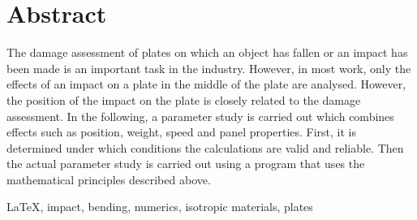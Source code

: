 \chapter*{Abstract} 

The damage assessment of plates on which an object has fallen or an impact has been made is an important task in the industry. However, in most work, only the effects of an impact on a plate in the middle of the plate are analysed. However, the position of the impact on the plate is closely related to the damage assessment. In the following, a parameter study is carried out which combines effects such as position, weight, speed and panel properties. First, it is determined under which conditions the calculations are valid and reliable. Then the actual parameter study is carried out using a program that uses the mathematical principles described above.

\begin{keywords}
\LaTeX, impact, bending, numerics, isotropic materials, plates
\end{keywords}
